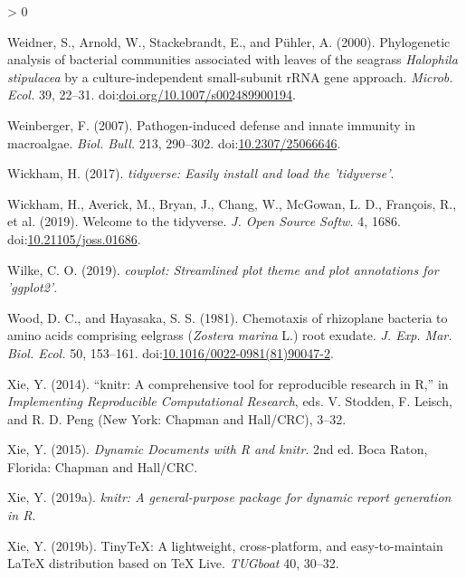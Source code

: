 \documentclass[
  12pt,
]{article}
\newlength{\cslhangindent}
\newenvironment{CSLReferences}[2] %
 {%
  \setlength{\parindent}{0pt}
  \ifodd #1 \everypar{\setlength{\hangindent}{\cslhangindent}}\ignorespaces\fi
  \ifnum #2 > 0
  \setlength{\parskip}{#2\baselineskip}
  \fi
 }%
 {}
\begin{document}
\begin{CSLReferences}{1}{0}
\leavevmode\hypertarget{ref-Weidner2000}{}%
Weidner, S., Arnold, W., Stackebrandt, E., and Pühler, A. (2000).
Phylogenetic analysis of bacterial communities associated with leaves of
the seagrass {\emph{Halophila stipulacea}} by a culture-independent
small-subunit {rRNA} gene approach. \emph{Microb. Ecol.} 39, 22--31.
doi:\href{https://doi.org/doi.org/10.1007/s002489900194}{doi.org/10.1007/s002489900194}.

\leavevmode\hypertarget{ref-Weinberger2007}{}%
Weinberger, F. (2007). Pathogen-induced defense and innate immunity in
macroalgae. \emph{Biol. Bull.} 213, 290--302.
doi:\href{https://doi.org/10.2307/25066646}{10.2307/25066646}.

\leavevmode\hypertarget{ref-Wickham2017}{}%
Wickham, H. (2017). \emph{{tidyverse}: Easily install and load the
'tidyverse'}.

\leavevmode\hypertarget{ref-Wickham2019}{}%
Wickham, H., Averick, M., Bryan, J., Chang, W., McGowan, L. D.,
François, R., et al. (2019). Welcome to the tidyverse. \emph{J. Open
Source Softw.} 4, 1686.
doi:\href{https://doi.org/10.21105/joss.01686}{10.21105/joss.01686}.

\leavevmode\hypertarget{ref-Wilke2019}{}%
Wilke, C. O. (2019). \emph{{cowplot}: Streamlined plot theme and plot
annotations for {'ggplot2'}}.

\leavevmode\hypertarget{ref-Wood1981}{}%
Wood, D. C., and Hayasaka, S. S. (1981). Chemotaxis of rhizoplane
bacteria to amino acids comprising eelgrass ({{\emph{Zostera marina}}
L.) root exudate}. \emph{J. Exp. Mar. Biol. Ecol.} 50, 153--161.
doi:\href{https://doi.org/10.1016/0022-0981(81)90047-2}{10.1016/0022-0981(81)90047-2}.

\leavevmode\hypertarget{ref-Xie2014}{}%
Xie, Y. (2014). {``{knitr}: A comprehensive tool for reproducible
research in {R},''} in \emph{Implementing {Reproducible Computational
Research}}, eds. V. Stodden, F. Leisch, and R. D. Peng ({New York}:
{Chapman and Hall/CRC}), 3--32.

\leavevmode\hypertarget{ref-Xie2015}{}%
Xie, Y. (2015). \emph{Dynamic {Documents} with {R} and knitr}. 2nd ed.
{Boca Raton, Florida}: {Chapman and Hall/CRC}.

\leavevmode\hypertarget{ref-Xie2019}{}%
Xie, Y. (2019a). \emph{{knitr}: A general-purpose package for dynamic
report generation in {R}}.

\leavevmode\hypertarget{ref-Xie2019a}{}%
Xie, Y. (2019b). {TinyTeX}: A lightweight, cross-platform, and
easy-to-maintain {LaTeX} distribution based on {TeX Live}.
\emph{TUGboat} 40, 30--32.


\end{CSLReferences}
\end{document}
